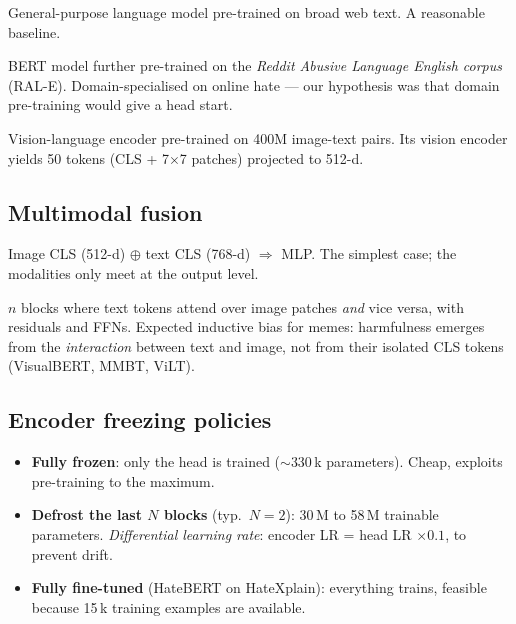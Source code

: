 \documentclass[11pt,a4paper]{article}
\begin{document}
\begin{description}[leftmargin=*]
    \item[roberta-base.] General-purpose language model pre-trained on broad web
    text. A reasonable baseline.
    \item[GroNLP/hateBERT.] BERT model further pre-trained on the \emph{Reddit
    Abusive Language English corpus} (RAL-E). Domain-specialised on online hate ---
    our hypothesis was that domain pre-training would give a head start.
    \item[openai/clip-vit-base-patch32.] Vision-language encoder pre-trained on
    400M image-text pairs. Its vision encoder yields 50 tokens (CLS + 7$\times$7
    patches) projected to 512-d.
\end{description}

\subsection{Multimodal fusion}

\begin{description}[leftmargin=*]
    \item[Late-fusion via concatenation.] Image CLS (512-d) $\oplus$ text CLS
    (768-d) $\Rightarrow$ MLP. The simplest case; the modalities only meet at the
    output level.
    \item[Bidirectional cross-attention.] $n$ blocks where text tokens attend over
    image patches \emph{and} vice versa, with residuals and FFNs. Expected
    inductive bias for memes: harmfulness emerges from the \emph{interaction}
    between text and image, not from their isolated CLS tokens (VisualBERT, MMBT,
    ViLT).
\end{description}

\subsection{Encoder freezing policies}

\begin{itemize}[leftmargin=*]
    \item \textbf{Fully frozen}: only the head is trained ($\sim$330\,k parameters).
    Cheap, exploits pre-training to the maximum.
    \item \textbf{Defrost the last $N$ blocks} (typ.\ $N=2$): 30\,M to 58\,M
    trainable parameters. \emph{Differential learning rate}: encoder LR = head LR
    $\times 0.1$, to prevent drift.
    \item \textbf{Fully fine-tuned} (HateBERT on HateXplain): everything trains,
    feasible because 15\,k training examples are available.
\end{itemize}
\end{document}
